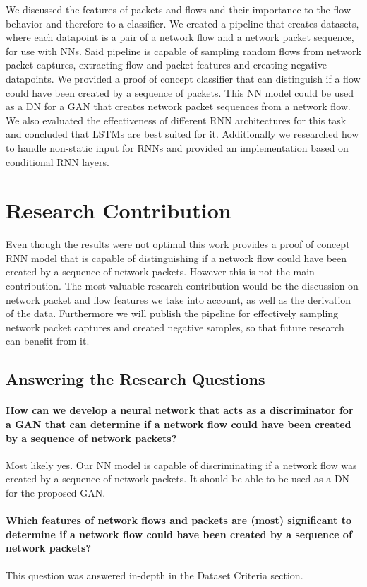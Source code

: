 \documentclass[
	ngerman,
	ruledheaders=section,%
	class=report,%
	thesis={type=bachelor},%
	accentcolor=9c,%
	custommargins=true,%
	marginpar=false,%
	parskip=half-,%
	fontsize=11pt,%
]{tudapub}
\begin{document}
We discussed the features of packets and flows and their importance to the flow behavior and therefore to a classifier.
We created a pipeline that creates datasets, where each datapoint is a pair of a network flow and a network packet sequence, for use with NNs.
Said pipeline is capable of sampling random flows from network packet captures, extracting flow and packet features and creating negative datapoints.
We provided a proof of concept classifier that can distinguish if a flow could have been created by a sequence of packets.
This NN model could be used as a DN for a GAN that creates network packet sequences from a network flow.
We also evaluated the effectiveness of different RNN architectures for this task
and concluded that LSTMs are best suited for it.
Additionally we researched how to handle non-static input for RNNs and provided an implementation based on conditional RNN layers.

\section{Research Contribution}

Even though the results were not optimal this work provides a proof of concept RNN model that is capable of distinguishing if a network flow could have been created by a sequence of network packets.
However this is not the main contribution.
The most valuable research contribution would be the discussion on network packet and flow features we take into account, as well as the derivation of the data.
Furthermore we will publish the pipeline for effectively sampling network packet captures and created negative samples, so that future research can benefit from it.

\subsection{Answering the Research Questions}

\paragraph{How can we develop a neural network that acts as a discriminator for a GAN that can determine if a network flow could have been created by a sequence of network packets?}
Most likely yes.
Our NN model is capable of discriminating if a network flow was created by a sequence of network packets.
It should be able to be used as a DN for the proposed GAN.

\paragraph{Which features of network flows and packets are (most) significant to determine if a network flow could have been created by a sequence of network packets?}
This question was answered in-depth in the Dataset Criteria section.
\end{document}
